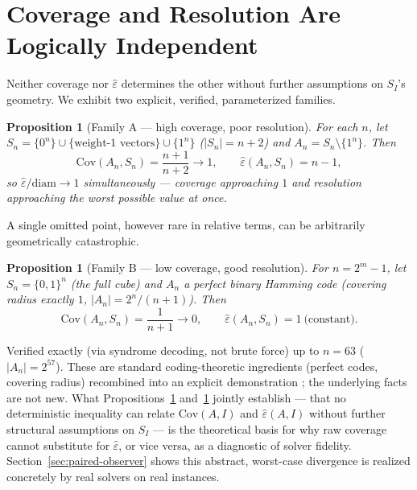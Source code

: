 \documentclass[11pt]{article}
\newtheorem{proposition}[theorem]{Proposition}
\theoremstyle{definition}
\theoremstyle{remark}
\newcommand{\Shat}{S_I}
\newcommand{\epshat}{\hat\varepsilon}
\newcommand{\Cov}{\mathrm{Cov}}
\begin{document}
\section{Coverage and Resolution Are Logically Independent}
\label{sec:coverage-resolution}

Neither coverage nor $\epshat$ determines the other without further assumptions on $\Shat$'s geometry. We exhibit two explicit, verified, parameterized families.

\begin{proposition}[Family A --- high coverage, poor resolution]
\label{prop:family-a}
For each $n$, let $S_n = \{0^n\} \cup \{\text{weight-1 vectors}\} \cup \{1^n\}$ ($|S_n|=n+2$) and $A_n = S_n \setminus \{1^n\}$. Then
\[
\Cov(A_n,S_n) = \frac{n+1}{n+2} \to 1, \qquad \epshat(A_n,S_n) = n-1,
\]
so $\epshat/\mathrm{diam} \to 1$ simultaneously --- coverage approaching $1$ and resolution approaching the worst possible value at once.
\end{proposition}

A single omitted point, however rare in relative terms, can be arbitrarily geometrically catastrophic.

\begin{proposition}[Family B --- low coverage, good resolution]
\label{prop:family-b}
For $n=2^m-1$, let $S_n = \{0,1\}^n$ (the full cube) and $A_n$ a perfect binary Hamming code (covering radius exactly $1$, $|A_n| = 2^n/(n+1)$). Then
\[
\Cov(A_n,S_n) = \frac{1}{n+1} \to 0, \qquad \epshat(A_n,S_n) = 1 \ \text{(constant)}.
\]
\end{proposition}

Verified exactly (via syndrome decoding, not brute force) up to $n=63$ ($|A_n| = 2^{57}$). These are standard coding-theoretic ingredients (perfect codes, covering radius) recombined into an explicit demonstration \citep{cohen1997covering}; the underlying facts are not new. What Propositions~\ref{prop:family-a} and~\ref{prop:family-b} jointly establish --- that no deterministic inequality can relate $\Cov(A,I)$ and $\epshat(A,I)$ without further structural assumptions on $\Shat$ --- is the theoretical basis for why raw coverage cannot substitute for $\epshat$, or vice versa, as a diagnostic of solver fidelity. Section~\ref{sec:paired-observer} shows this abstract, worst-case divergence is realized concretely by real solvers on real instances.
\end{document}
